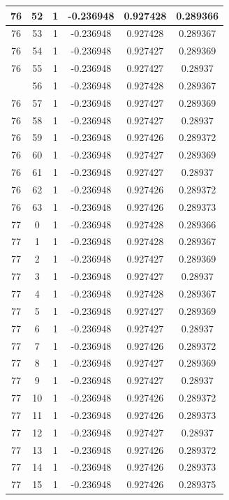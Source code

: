 \documentclass[12pt,a4paper]{article}
\numberwithin{equation}{section}
\numberwithin{figure}{section}
\numberwithin{table}{section}
\begin{document}
\begin{longtable}{|c|c|c|c|c|c|}
76 & 52 & 1 & -0.236948 & 0.927428 & 0.289366 \\ \hline
76 & 53 & 1 & -0.236948 & 0.927428 & 0.289367 \\ \hline
76 & 54 & 1 & -0.236948 & 0.927427 & 0.289369 \\ \hline
76 & 55 & 1 & -0.236948 & 0.927427 & 0.28937 \\ \hline
\pagebreak
76 & 56 & 1 & -0.236948 & 0.927428 & 0.289367 \\ \hline
76 & 57 & 1 & -0.236948 & 0.927427 & 0.289369 \\ \hline
76 & 58 & 1 & -0.236948 & 0.927427 & 0.28937 \\ \hline
76 & 59 & 1 & -0.236948 & 0.927426 & 0.289372 \\ \hline
76 & 60 & 1 & -0.236948 & 0.927427 & 0.289369 \\ \hline
76 & 61 & 1 & -0.236948 & 0.927427 & 0.28937 \\ \hline
76 & 62 & 1 & -0.236948 & 0.927426 & 0.289372 \\ \hline
76 & 63 & 1 & -0.236948 & 0.927426 & 0.289373 \\ \hline
77 & 0 & 1 & -0.236948 & 0.927428 & 0.289366 \\ \hline
77 & 1 & 1 & -0.236948 & 0.927428 & 0.289367 \\ \hline
77 & 2 & 1 & -0.236948 & 0.927427 & 0.289369 \\ \hline
77 & 3 & 1 & -0.236948 & 0.927427 & 0.28937 \\ \hline
77 & 4 & 1 & -0.236948 & 0.927428 & 0.289367 \\ \hline
77 & 5 & 1 & -0.236948 & 0.927427 & 0.289369 \\ \hline
77 & 6 & 1 & -0.236948 & 0.927427 & 0.28937 \\ \hline
77 & 7 & 1 & -0.236948 & 0.927426 & 0.289372 \\ \hline
77 & 8 & 1 & -0.236948 & 0.927427 & 0.289369 \\ \hline
77 & 9 & 1 & -0.236948 & 0.927427 & 0.28937 \\ \hline
77 & 10 & 1 & -0.236948 & 0.927426 & 0.289372 \\ \hline
77 & 11 & 1 & -0.236948 & 0.927426 & 0.289373 \\ \hline
77 & 12 & 1 & -0.236948 & 0.927427 & 0.28937 \\ \hline
77 & 13 & 1 & -0.236948 & 0.927426 & 0.289372 \\ \hline
77 & 14 & 1 & -0.236948 & 0.927426 & 0.289373 \\ \hline
77 & 15 & 1 & -0.236948 & 0.927426 & 0.289375 \\ \hline

\end{longtable}
\end{document}
